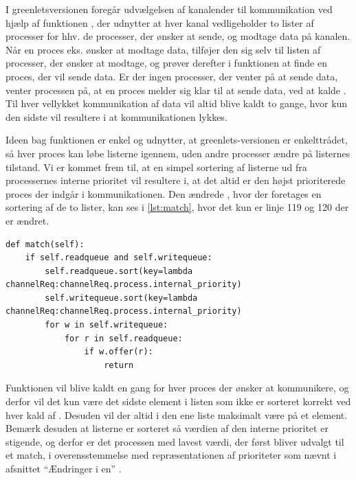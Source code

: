 I greenletsversionen foregår udvælgelsen af kanalender til kommunikation ved hjælp af funktionen , der udnytter at  hver kanal vedligeholder to lister af processer for hhv. de processer, der ønsker at sende, og modtage data på kanalen. Når en proces eks. ønsker at modtage data, tilføjer den sig selv til listen af processer, der ønsker at modtage, og prøver derefter i  funktionen at finde en proces, der vil sende data. Er der ingen processer, der venter på at sende data, venter processen på, at en proces melder sig klar til at sende data, ved at kalde . Til hver vellykket kommunikation af data vil  altid blive kaldt to gange, hvor kun den sidste vil resultere i at kommunikationen lykkes.

Ideen bag funktionen  er enkel og  udnytter, at greenlets-versionen er enkelttrådet, så hver proces kan løbe listerne igennem, uden andre processer ændre på listernes tilstand.  Vi er kommet frem til, at  en simpel sortering af listerne ud fra processernes interne prioritet vil resultere i, at det altid er den højst prioriterede proces der indgår i kommunikationen. Den ændrede , hvor der foretages en sortering af de to lister, kan ses i \cref{lst:match}, hvor det kun er linje 119 og 120 der er ændret.

\begin{lstlisting}[firstnumber=117 ,float=hbtp, label=lst:match, caption=Funktionen \code{match} der sorterer kanalrequests.]
def match(self):        
    if self.readqueue and self.writequeue:
        self.readqueue.sort(key=lambda channelReq:channelReq.process.internal_priority)
        self.writequeue.sort(key=lambda channelReq:channelReq.process.internal_priority)
        for w in self.writequeue:
            for r in self.readqueue:
                if w.offer(r):
                    return       
\end{lstlisting}

Funktionen  vil blive kaldt en gang for hver proces der ønsker at kommunikere, og derfor vil det kun være det sidste element i listen som ikke er sorteret korrekt ved hver kald af . Desuden vil der altid i den ene liste maksimalt være på et element. Bemærk desuden at listerne er sorteret så værdien af den interne prioritet er stigende, og derfor er det processen med lavest værdi, der først bliver udvalgt til et match, i overensstemmelse med repræsentationen af prioriteter som nævnt i afsnittet ``Ændringer i \sched en'' .

